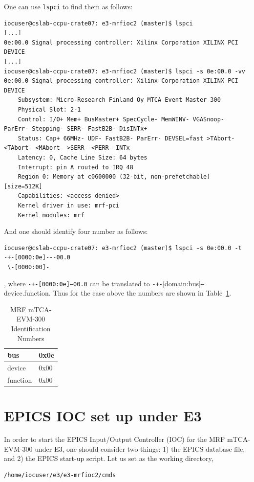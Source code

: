 \documentclass[11pt
  , a4paper
  , article
  , oneside
  , showtrims
]{memoir}
\begin{document}
One can use \texttt{lspci} to find them as follows:
\begin{lstlisting}[style=termstyle]
iocuser@cslab-ccpu-crate07: e3-mrfioc2 (master)$ lspci
[...]
0e:00.0 Signal processing controller: Xilinx Corporation XILINX PCI DEVICE
[...]
iocuser@cslab-ccpu-crate07: e3-mrfioc2 (master)$ lspci -s 0e:00.0 -vv
0e:00.0 Signal processing controller: Xilinx Corporation XILINX PCI DEVICE
	Subsystem: Micro-Research Finland Oy MTCA Event Master 300
	Physical Slot: 2-1
	Control: I/O+ Mem+ BusMaster+ SpecCycle- MemWINV- VGASnoop- ParErr- Stepping- SERR- FastB2B- DisINTx+
	Status: Cap+ 66MHz- UDF- FastB2B- ParErr- DEVSEL=fast >TAbort- <TAbort- <MAbort- >SERR- <PERR- INTx-
	Latency: 0, Cache Line Size: 64 bytes
	Interrupt: pin A routed to IRQ 48
	Region 0: Memory at c0600000 (32-bit, non-prefetchable) [size=512K]
	Capabilities: <access denied>
	Kernel driver in use: mrf-pci
	Kernel modules: mrf

\end{lstlisting}

And one should identify four number as follows:
\begin{lstlisting}[style=termstyle]
iocuser@cslab-ccpu-crate07: e3-mrfioc2 (master)$ lspci -s 0e:00.0 -t
-+-[0000:0e]---00.0
 \-[0000:00]-
\end{lstlisting}
, where \texttt{-+-[0000:0e]---00.0} can be translated to \texttt{-+-}[domain:bus]\texttt{---}device.function. Thus for the case above the numbers are shown in Table~\ref{table:pciidnumber}.\begin{table}[!htb]
  \centering
  \begin{tabular}{l|l}
    \toprule
    bus      & 0x0e \\\midrule
    device   & 0x00 \\\midrule
    function & 0x00 \\\bottomrule
  \end{tabular}
  \caption[]{MRF mTCA-EVM-300 Identification Numbers}
  \label{table:pciidnumber}
\end{table}


\section{EPICS IOC set up under E3}
In order to start the EPICS Input/Output Controller (IOC) for the MRF mTCA-EVM-300 under E3, one should consider two things: 1) the EPICS database file, and 2) the EPICS start-up script. Let us set as the working directory,
\begin{lstlisting}[style=termstyle, label={list:pwd}, caption={Working directory in the ICS lab.} ]
/home/iocuser/e3/e3-mrfioc2/cmds
\end{lstlisting}
\end{document}
